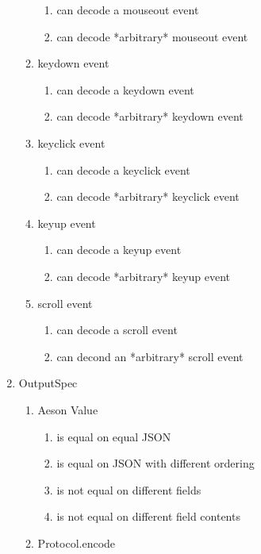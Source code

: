 \begin{enumerate}[{T}1]
\begin{enumerate}
\begin{enumerate}
			\item can decode a mouseout event
			\item can decode *arbitrary* mouseout event
		\end{enumerate}
		\item keydown event
		\begin{enumerate}
			\item can decode a keydown event
			\item can decode *arbitrary* keydown event
		\end{enumerate}
		\item keyclick event
		\begin{enumerate}
			\item can decode a keyclick event
			\item can decode *arbitrary* keyclick event
			\end{enumerate}
		\item keyup event
		\begin{enumerate}
			\item can decode a keyup event
			\item can decode *arbitrary* keyup event
		\end{enumerate}
		\item scroll event
		\begin{enumerate}
			\item can decode a scroll event
			\item can decond an *arbitrary* scroll event
		\end{enumerate}
	\end{enumerate}
	\item OutputSpec
	\begin{enumerate}
	    \item Aeson Value
	    \begin{enumerate}
	        \item is equal on equal JSON
	        \item is equal on JSON with different ordering
	        \item is not equal on different fields
	        \item is not equal on different field contents
	    \end{enumerate}
	    \item Protocol.encode
	    \begin{enumerate}

\end{enumerate}
\end{enumerate}
\end{enumerate}
